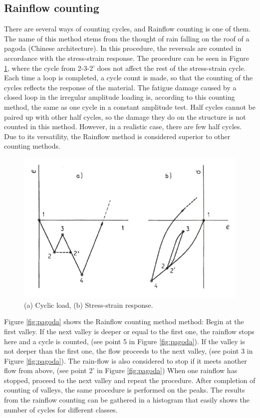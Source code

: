 \subsection{Rainflow counting}
\label{sec:rainflow}
There are several ways of counting cycles, and Rainflow counting is one of them. The name of this method stems from the thought of rain falling on the roof of a pagoda (Chinese architecture). In this procedure, the reversals are counted in accordance with the stress-strain response. The procedure can be seen in Figure \ref{fig:count}, where the cycle from 2-3-2' does not affect the rest of the stress-strain cycle. Each time a loop is completed, a cycle count is made, so that the counting of the cycles reflects the response of the material. The fatigue damage caused by a closed loop in the irregular amplitude loading is, according to this counting method, the same as one cycle in a constant amplitude test. Half cycles cannot be paired up with other half cycles, so the damage they do on the structure is not counted in this method. However, in a realistic case, there are few half cycles. Due to its versatility, the Rainflow method is considered superior to other counting methods. 

\begin{figure}[H]
\centering
\includegraphics[scale=0.7]{figures/count}
\caption[$\; \:$Cyclic load and stress-strain response]{(a) Cyclic load, (b) Stress-strain response.   \cite{fatigue2016} }
 \label{fig:count}
\end{figure}

\noindent Figure \ref{fig:pagoda} shows the Rainflow counting method method:\newline 
\newline
Begin at the first valley. If the next valley is deeper or equal to the first one, the rainflow stops here and a cycle is counted, (see point 5 in Figure \ref{fig:pagoda}). If the valley is not deeper than the first one, the flow proceeds to the next valley, (see point 3 in Figure \ref{fig:pagoda}). The rain-flow is also considered to stop if it meets another flow from above, (see point 2' in Figure \ref{fig:pagoda}) When one rainflow has stopped, proceed to the next valley and repeat the procedure. After completion of counting of valleys, the same procedure is performed on the peaks. The results from the rainflow counting can be gathered in a histogram that easily shows the number of cycles for different classes. 

